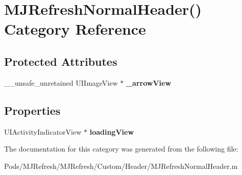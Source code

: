 \hypertarget{category_m_j_refresh_normal_header_07_08}{}\section{M\+J\+Refresh\+Normal\+Header() Category Reference}
\label{category_m_j_refresh_normal_header_07_08}
\subsection*{Protected Attributes}
\begin{DoxyCompactItemize}
\item 
\mbox{\label{category_m_j_refresh_normal_header_07_08_ae222b835968639507772493fc41850c5}} 
\+\_\+\+\_\+unsafe\+\_\+unretained U\+I\+Image\+View $\ast$ {\bfseries \+\_\+arrow\+View}
\end{DoxyCompactItemize}
\subsection*{Properties}
\begin{DoxyCompactItemize}
\item 
\mbox{\label{category_m_j_refresh_normal_header_07_08_a9edcc1bd9dc1a4c96005edd3d464db77}} 
U\+I\+Activity\+Indicator\+View $\ast$ {\bfseries loading\+View}
\end{DoxyCompactItemize}


The documentation for this category was generated from the following file\+:\begin{DoxyCompactItemize}
\item 
Pods/\+M\+J\+Refresh/\+M\+J\+Refresh/\+Custom/\+Header/M\+J\+Refresh\+Normal\+Header.\+m\end{DoxyCompactItemize}
